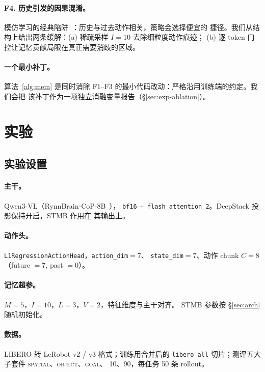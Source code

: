 \documentclass[11pt]{ctexart}
\begin{document}
\paragraph{F4. 历史引发的因果混淆。}
模仿学习的经典陷阱~\cite{dehaan2019causal}：历史与过去动作相关，策略会选择便宜的
捷径。我们从结构上给出两条缓解：(a) 稀疏采样 $I{=}10$ 去除细粒度动作痕迹；
(b) 逐 token 门控让记忆贡献局限在真正需要消歧的区域。

\paragraph{一个最小补丁。}
算法~\ref{alg:mem} 是同时消除 F1–F3 的最小代码改动：严格沿用训练端的约定。我们会把
该补丁作为一项独立消融变量报告（\S\ref{sec:exp-ablation}）。

\section{实验}
\label{sec:exp}

\subsection{实验设置}

\paragraph{主干。} Qwen3-VL（RynnBrain-CoP-8B~\cite{alibaba2025rynnbrain}），
\texttt{bf16} + \texttt{flash\_attention\_2}。DeepStack 投影保持开启，STMB 作用在
其输出上。

\paragraph{动作头。} \texttt{L1RegressionActionHead}，\texttt{action\_dim}$=7$、
\texttt{state\_dim}$=7$、动作 chunk $C{=}8$（future $=7$, past $=0$）。

\paragraph{记忆超参。} $M{=}5$，$I{=}10$，$L{=}3$，$V{=}2$，特征维度与主干对齐。
STMB 参数按 \S\ref{sec:arch} 随机初始化。

\paragraph{数据。} LIBERO 转 LeRobot v2 / v3 格式；训练用合并后的 \texttt{libero\_all}
切片；测评五大子套件 \textsc{spatial}、\textsc{object}、\textsc{goal}、
\textsc{10}、\textsc{90}，每任务 50 条 rollout。
\end{document}
